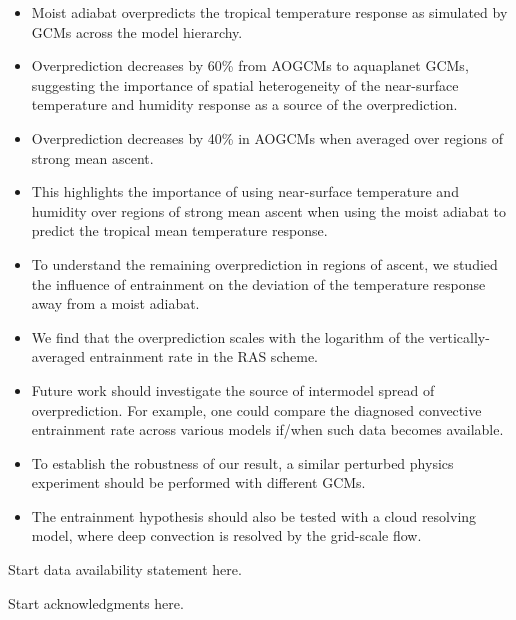 \documentclass{ametsocV5}
\begin{document}
\begin{itemize}
\item Moist adiabat overpredicts the tropical temperature response as simulated by GCMs across the model hierarchy.
\item Overprediction decreases by 60\% from AOGCMs to aquaplanet GCMs, suggesting the importance of spatial heterogeneity of the near-surface temperature and humidity response as a source of the overprediction.
\item Overprediction decreases by 40\% in AOGCMs when averaged over regions of strong mean ascent.
\item This highlights the importance of using near-surface temperature and humidity over regions of strong mean ascent when using the moist adiabat to predict the tropical mean temperature response.
\item To understand the remaining overprediction in regions of ascent, we studied the influence of entrainment on the deviation of the temperature response away from a moist adiabat.
\item We find that the overprediction scales with the logarithm of the vertically-averaged entrainment rate in the RAS scheme.
\item Future work should investigate the source of intermodel spread of overprediction. For example, one could compare the diagnosed convective entrainment rate across various models if/when such data becomes available.
\item To establish the robustness of our result, a similar perturbed physics experiment should be performed with different GCMs.
\item The entrainment hypothesis should also be tested with a cloud resolving model, where deep convection is resolved by the grid-scale flow.
\end{itemize}

%
\datastatement
Start data availability statement here.

%
\acknowledgments
Start acknowledgments here.
\end{document}
